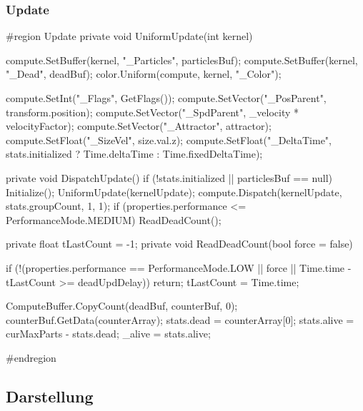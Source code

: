 \subsubsection{Update}
\begin{csh}
#region Update
private void UniformUpdate(int kernel)
{
    compute.SetBuffer(kernel, "_Particles", particlesBuf);
    compute.SetBuffer(kernel, "_Dead", deadBuf);
    color.Uniform(compute, kernel, "_Color");

    compute.SetInt("_Flags", GetFlags());
    compute.SetVector("_PosParent", transform.position);
    compute.SetVector("_SpdParent", _velocity * velocityFactor);
    compute.SetVector("_Attractor", attractor);
    compute.SetFloat("_SizeVel", size.val.z);
    compute.SetFloat("_DeltaTime", stats.initialized ? Time.deltaTime : Time.fixedDeltaTime);
}

private void DispatchUpdate()
{
    if (!stats.initialized || particlesBuf == null) Initialize();
    UniformUpdate(kernelUpdate);
    compute.Dispatch(kernelUpdate, stats.groupCount, 1, 1);
    if (properties.performance <= PerformanceMode.MEDIUM)
        ReadDeadCount();
}

private float tLastCount = -1;
private void ReadDeadCount(bool force = false)
{
    if (!(properties.performance == PerformanceMode.LOW ||
        force || Time.time - tLastCount >= deadUpdDelay)) return;
    tLastCount = Time.time;

    ComputeBuffer.CopyCount(deadBuf, counterBuf, 0);
    counterBuf.GetData(counterArray);
    stats.dead = counterArray[0];
    stats.alive = curMaxParts - stats.dead;
    _alive = stats.alive;
}

#endregion
\end{csh}

\subsection{Darstellung}

